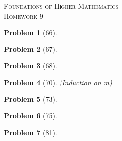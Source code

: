 \documentclass{article}
\theoremstyle{problem}
\newtheorem{prob}{Problem}
\theoremstyle{plain}
\theoremstyle{remark}
\begin{document}
\begin{center}
\textsc{\Large Foundations of Higher Mathematics}\\[.3cm]
\textsc{\Large Homework 9}
\end{center}

\begin{prob}[66]


\end{prob}
%

\begin{prob}[67]

\end{prob}
%

\begin{prob}[68]

\end{prob}
%

\begin{prob}[70] (Induction on m)

\end{prob}
% 

\begin{prob}[73]

\end{prob}
%

\begin{prob}[75]

\end{prob}
%

\begin{prob}[81]

\end{prob}
%
\end{document}
